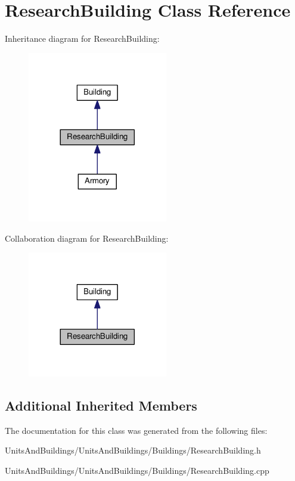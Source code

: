 \hypertarget{class_research_building}{}\section{Research\+Building Class Reference}
\label{class_research_building}


Inheritance diagram for Research\+Building\+:
\nopagebreak
\begin{figure}[H]
\begin{center}
\leavevmode
\includegraphics[width=173pt]{class_research_building__inherit__graph}
\end{center}
\end{figure}


Collaboration diagram for Research\+Building\+:
\nopagebreak
\begin{figure}[H]
\begin{center}
\leavevmode
\includegraphics[width=173pt]{class_research_building__coll__graph}
\end{center}
\end{figure}
\subsection*{Additional Inherited Members}


The documentation for this class was generated from the following files\+:\begin{DoxyCompactItemize}
\item 
Units\+And\+Buildings/\+Units\+And\+Buildings/\+Buildings/Research\+Building.\+h\item 
Units\+And\+Buildings/\+Units\+And\+Buildings/\+Buildings/Research\+Building.\+cpp\end{DoxyCompactItemize}
